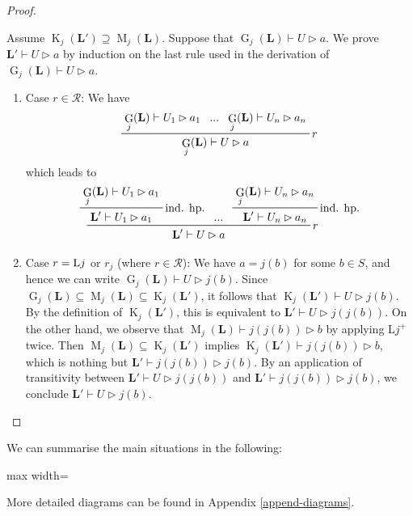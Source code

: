 \documentclass[runningheads]{llncs}
\renewcommand{\L}{\mathbf{L}}
\DeclareMathOperator{\Glivenko}{G}
\DeclareMathOperator{\Kleisli}{K}
\DeclareMathOperator{\Maximal}{M}
\begin{document}
\begin{proof}
\begin{enumerate}
        Assume $\Kleisli_j(\L')\supseteq\Maximal_j(\L)$. 
        Suppose that $\Glivenko_j(\L)\vdash U\rhd a$. We prove $\L'\vdash U\rhd a$ by induction on the last rule used in the derivation of $\Glivenko_j(\L)\vdash U\rhd a$.
        \begin{enumerate}
            \item Case $r\in \mathcal{R}$:
            We have
            \[
            \prftree[r]{\textnormal{$r$}}{\Glivenko_j(\L)\vdash U_1\rhd a_1}{...}{\Glivenko_j(\L)\vdash U_n\rhd a_n}{\Glivenko_j(\L)\vdash U\rhd a}
            \]
            which leads to
            \[
            \prftree[r]{\textnormal{$r$}}{
                \prftree[r]{ind. hp.}{\Glivenko_j(\L)\vdash U_1\rhd a_1}{\L'\vdash U_1\rhd a_1}
            }{...}{
                \prftree[r]{ind. hp.}{\Glivenko_j(\L)\vdash U_n\rhd a_n}{\L'\vdash U_n\rhd a_n}
            }{\L'\vdash U\rhd a}
            \]
            \item Case $r=\textnormal{L$j$}$ or $r_j$ (where $r\in \mathcal{R}$): We have $a = j(b)$ for some $b \in S$, and hence we can write $\Glivenko_j(\L) \vdash U \rhd j(b)$. Since $\Glivenko_j(\L) \subseteq \Maximal_j(\L) \subseteq \Kleisli_j(\L')$, it follows that $\Kleisli_j(\L') \vdash U \rhd j(b)$. By the definition of $\Kleisli_j(\L')$, this is equivalent to $\L' \vdash U \rhd j(j(b))$. 
            On the other hand, we observe that $\Maximal_j(\L)\vdash j(j(b))\rhd b$ by applying L$j^+$ twice. Then $\Maximal_j(\L)\subseteq\Kleisli_j(\L')$ implies $\Kleisli_j(\L')\vdash j(j(b))\rhd b$, which is nothing but $\L'\vdash j(j(b))\rhd j(b)$.
            By an application of transitivity between $\L' \vdash U \rhd j(j(b))$ and $\L'\vdash j(j(b))\rhd j(b)$, we conclude $\L' \vdash U \rhd j(b)$.
            \qedhere
        \end{enumerate}
    \end{enumerate}
\end{proof}

We can summarise the main situations in the following:

\begin{center}
\begin{adjustbox}{max width=\textwidth}
\end{adjustbox}
\end{center}
More detailed diagrams can be found in Appendix \ref{append-diagrams}.
\end{document}
